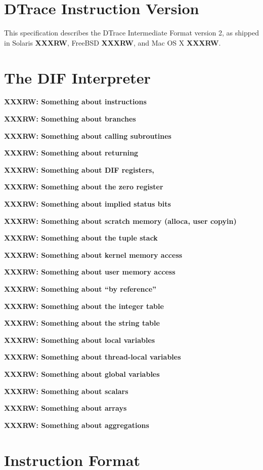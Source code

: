 
\section{DTrace Instruction Version}

This specification describes the DTrace Intermediate Format version 2, as
shipped in Solaris \textbf{XXXRW}, FreeBSD \textbf{XXXRW}, and Mac OS X
\textbf{XXXRW}.

\section{The DIF Interpreter}

\textbf{XXXRW: Something about instructions}

\textbf{XXXRW: Something about branches}

\textbf{XXXRW: Something about calling subroutines}

\textbf{XXXRW: Something about returning}

\textbf{XXXRW: Something about DIF registers, \nregs{}}

\textbf{XXXRW: Something about the zero register}

\textbf{XXXRW: Something about implied status bits}

\textbf{XXXRW: Something about scratch memory (alloca, user copyin)}

\textbf{XXXRW: Something about the tuple stack}

\textbf{XXXRW: Something about kernel memory access}

\textbf{XXXRW: Something about user memory access}

\textbf{XXXRW: Something about ``by reference''}

\textbf{XXXRW: Something about the integer table}

\textbf{XXXRW: Something about the string table}

\textbf{XXXRW: Something about local variables}

\textbf{XXXRW: Something about thread-local variables}

\textbf{XXXRW: Something about global variables}

\textbf{XXXRW: Something about scalars}

\textbf{XXXRW: Something about arrays}

\textbf{XXXRW: Something about aggregations}

\section{Instruction Format}

